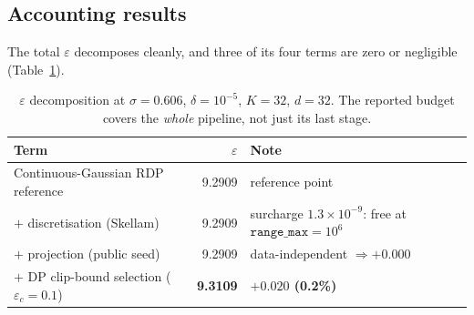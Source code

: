 \documentclass[pdflatex,sn-mathphys-num,iicol]{sn-jnl}
\theoremstyle{thmstyleone}%
\theoremstyle{thmstyletwo}%
\theoremstyle{thmstylethree}%
\newcommand{\eps}{\varepsilon}
\begin{document}
\subsection{Accounting results}\label{sec:accounting-results}

The total $\eps$ decomposes cleanly, and three of its four terms are zero or negligible
(Table~\ref{tab:eps-decomp}).

\begin{table}[t]
  \centering
  \caption{$\eps$ decomposition at $\sigma = 0.606$, $\delta = 10^{-5}$, $K = 32$,
  $d = 32$. The reported budget covers the \emph{whole} pipeline, not just its last stage.}
  \label{tab:eps-decomp}
  \begin{tabular}{@{}lrl@{}}
    \toprule
    Term & $\eps$ & Note \\
    \midrule
    Continuous-Gaussian RDP reference   & 9.2909          & reference point \\
    $+$ discretisation (Skellam)        & 9.2909          & surcharge $1.3 \times 10^{-9}$: free at $\texttt{range\_max} = 10^{6}$ \\
    $+$ projection (public seed)        & 9.2909          & data-independent $\Rightarrow +0.000$ \\
    $+$ DP clip-bound selection ($\eps_c = 0.1$) & \textbf{9.3109} & \textbf{$+0.020$ (0.2\%)} \\
    \bottomrule
  \end{tabular}
\end{table}
\end{document}
